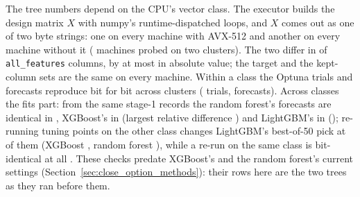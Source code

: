 The tree numbers depend on the CPU's vector class. The executor builds the design
matrix $X$ with numpy's runtime-dispatched loops, and $X$ comes out as one of two byte
strings: one on every machine with AVX-512 and another on every machine without it
(\campXHosts{} machines probed on two clusters). The two differ in \campXColsAll{} of
\campPAll{} \texttt{all\_features} columns, by at most \campXMaxAbs{} in absolute value; the
target and
the kept-column sets are the same on every machine. Within a class the Optuna trials and
forecasts reproduce bit for bit across clusters (\campSameClassTrials{} trials,
\campSameClassFcst{} forecasts). Across classes the fits part: from the same stage-1 records
the random forest's forecasts are identical in \campXFcstRf{}, XGBoost's in \campXFcstXgb{}
(largest relative difference \campXFcstMaxXgb) and LightGBM's in \campXFcstLgbm{}
(\campXFcstMaxLgbm); re-running \campXcPoints{} tuning points on the other class changes
LightGBM's best-of-50 pick at \campXcPickLgbm{} of them (XGBoost \campXcPickXgb{}, random
forest \campXcPickRf{}), while a re-run on the same class is bit-identical at all
\campXcSame{}. These checks predate XGBoost's and the random forest's current settings
(Section~\ref{sec:close_option_methods}): their rows here are the two trees as they ran
before them.

